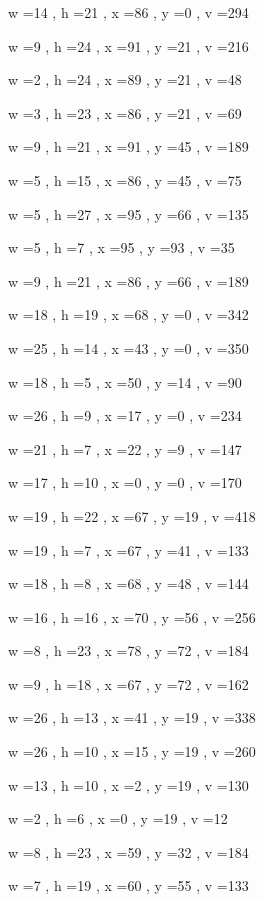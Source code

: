\documentclass[11pt]{article}
\begin{document}
w =14 , h =21 , x =86 , y =0 , v =294
\par
w =9 , h =24 , x =91 , y =21 , v =216
\par
w =2 , h =24 , x =89 , y =21 , v =48
\par
w =3 , h =23 , x =86 , y =21 , v =69
\par
w =9 , h =21 , x =91 , y =45 , v =189
\par
w =5 , h =15 , x =86 , y =45 , v =75
\par
w =5 , h =27 , x =95 , y =66 , v =135
\par
w =5 , h =7 , x =95 , y =93 , v =35
\par
w =9 , h =21 , x =86 , y =66 , v =189
\par
w =18 , h =19 , x =68 , y =0 , v =342
\par
w =25 , h =14 , x =43 , y =0 , v =350
\par
w =18 , h =5 , x =50 , y =14 , v =90
\par
w =26 , h =9 , x =17 , y =0 , v =234
\par
w =21 , h =7 , x =22 , y =9 , v =147
\par
w =17 , h =10 , x =0 , y =0 , v =170
\par
w =19 , h =22 , x =67 , y =19 , v =418
\par
w =19 , h =7 , x =67 , y =41 , v =133
\par
w =18 , h =8 , x =68 , y =48 , v =144
\par
w =16 , h =16 , x =70 , y =56 , v =256
\par
w =8 , h =23 , x =78 , y =72 , v =184
\par
w =9 , h =18 , x =67 , y =72 , v =162
\par
w =26 , h =13 , x =41 , y =19 , v =338
\par
w =26 , h =10 , x =15 , y =19 , v =260
\par
w =13 , h =10 , x =2 , y =19 , v =130
\par
w =2 , h =6 , x =0 , y =19 , v =12
\par
w =8 , h =23 , x =59 , y =32 , v =184
\par
w =7 , h =19 , x =60 , y =55 , v =133
\par
\newpage
\end{document}
